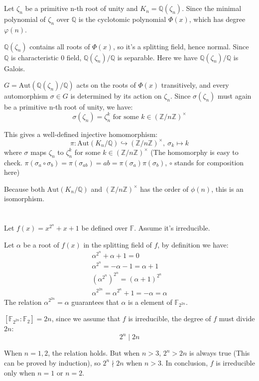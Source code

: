 \documentclass[12pt]{article}
\title{\mytitle}
\author{\myauthor}
\date{\today}
\theoremstyle{definition}
\theoremstyle{remark}
\begin{document}
\maketitle

\section{}
Let $\zeta_n$ be a primitive n-th root of unity and $K_n=\mathbb{Q}(\zeta_n)$. Since the minimal polynomial of $\zeta_n$ over $\mathbb{Q}$ is the cyclotomic polynomial $\Phi(x)$, which has degree $\varphi(n)$. 

$\mathbb{Q}(\zeta_n)$ contains all roots of $\Phi(x)$, so it's a splitting field, hence normal. Since $\mathbb{Q}$ is characteristic 0 field, $\mathbb{Q}(\zeta_n)/\mathbb{Q}$ is separable. Here we have $\mathbb{Q}(\zeta_n)/\mathbb{Q}$ is Galois.

$G=\mathrm{Aut}(\mathbb{Q}(\zeta_n)/\mathbb{Q})$ acts on the roots of $\Phi(x)$ transitively, and every automorphism $\sigma\in G$ is determined by its action on $\zeta_n$. Since $\sigma(\zeta_n)$ must again be a primitive n-th root of unity, we have:
$$\sigma(\zeta_n)=\zeta_n^k\text{ for some }k\in(\mathbb{Z}/n\mathbb{Z})^\times$$

This gives a well-defined injective homomorphism:
$$\pi:\mathrm{Aut}(K_n/\mathbb{Q})\hookrightarrow (\mathbb{Z}/n\mathbb{Z})^\times,\ \sigma_k\mapsto k$$
where $\sigma$ maps $\zeta_n$ to $\zeta_n^k$ for some $k\in(\mathbb{Z}/n\mathbb{Z})^\times$ (The homomorphy is easy to check. $\pi(\sigma_a\circ\sigma_b)=\pi(\sigma_{ab})=ab=\pi(\sigma_a)\pi(\sigma_b)$, $\circ$ stands for composition here)

Because both $\mathrm{Aut}(K_n/\mathbb{Q})$ and $(\mathbb{Z}/n\mathbb{Z})^\times$ has the order of $\phi(n)$, this is an isomorphism.

\section{}
Let $f(x)=x^{2^n}+x+1$ be defined over $\mathbb{F}$. Assume it's irreducible.

Let $\alpha$ be a root of $f(x)$ in the splitting field of $f$, by definition we have:
\begin{align*}
    \alpha^{2^n}+\alpha+1=0 \\
    \alpha^{2^n}=-\alpha-1=\alpha+1 \\
    (\alpha^{2^n})^{2^n}=(\alpha+1)^{2^n} \\
    \alpha^{2^{2n}}=\alpha^{2^n}+1=-\alpha=\alpha
\end{align*}
The relation $\alpha^{2^{2n}}=\alpha$ guarantees that $\alpha$ is a element of $\mathbb{F}_{2^{2n}}$.

$[\mathbb{F}_{2^{2n}}:\mathbb{F}_2]=2n$, since we assume that $f$ is irreducible, the degree of $f$ must divide $2n$:
$$2^{n}\mid 2n$$

When $n=1,2$, the relation holds. But when $n>3$, $2^n>2n$ is always true (This can be proved by induction), so $2^n \nmid 2n$ when $n>3$. In conclusion, $f$ is irreducible only when $n=1$ or $n=2$.
\end{document}
